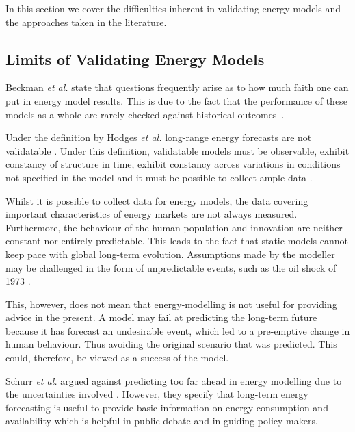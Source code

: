 
In this section we cover the difficulties inherent in validating energy models and the approaches taken in the literature.

\subsection{Limits of Validating Energy Models}

Beckman \textit{et al.} state that questions frequently arise as to how much faith one can put in energy model results. This is due to the fact that the performance of these models as a whole are rarely checked against historical outcomes~\cite{Beckman2011}.


Under the definition by Hodges \textit{et al.} \cite{Hodges} long-range energy forecasts are not validatable \cite{Craig2002}. Under this definition, validatable models must be observable, exhibit constancy of structure in time, exhibit constancy across variations in conditions not specified in the model and it must be possible to collect ample data \cite{Hodges}.


Whilst it is possible to collect data for energy models, the data covering important characteristics of energy markets are not always measured. Furthermore, the behaviour of the human population and innovation are neither constant nor entirely predictable. This leads to the fact that static models cannot keep pace with global long-term evolution. Assumptions made by the modeller may be challenged in the form of unpredictable events, such as the oil shock of 1973 \cite{Craig2002}.

This, however, does not mean that energy-modelling is not useful for providing advice in the present. A model may fail at predicting the long-term future because it has forecast an undesirable event, which led to a pre-emptive change in human behaviour. Thus avoiding the original scenario that was predicted. This could, therefore, be viewed as a success of the model.

Schurr \textit{et al.} argued against predicting too far ahead in energy modelling due to the uncertainties involved \cite{Schurr_1961}. However, they specify that long-term energy forecasting is useful to provide basic information on energy consumption and availability which is helpful in public debate and in guiding policy makers.


